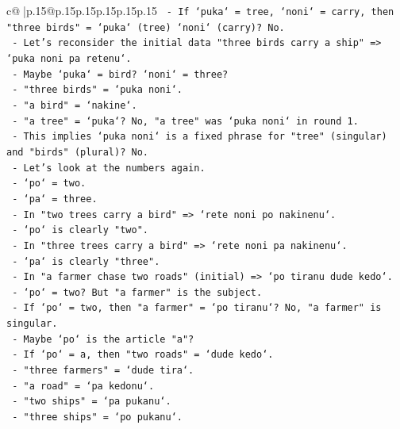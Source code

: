 \documentclass{article}
\begin{document}
{\begin{supertabular}{c@{$\;$}|p{.15\linewidth}@{}p{.15\linewidth}p{.15\linewidth}p{.15\linewidth}p{.15\linewidth}p{.15\linewidth}}
{{{\texttt{                {-} If `puka` = tree, `noni` = carry, then "three birds" = `puka` (tree) `noni` (carry)? No.} \\
\texttt{              {-} Let's reconsider the initial data "three birds carry a ship" => `puka noni pa retenu`.} \\
\texttt{                {-} Maybe `puka` = bird? `noni` = three?} \\
\texttt{                {-} "three birds" = `puka noni`.} \\
\texttt{                {-} "a bird" = `nakine`.} \\
\texttt{                {-} "a tree" = `puka`? No, "a tree" was `puka noni` in round 1.} \\
\texttt{                {-} This implies `puka noni` is a fixed phrase for "tree" (singular) and "birds" (plural)? No.} \\
\texttt{                {-} Let's look at the numbers again.} \\
\texttt{                {-} `po` = two.} \\
\texttt{                {-} `pa` = three.} \\
\texttt{                {-} In "two trees carry a bird" => `rete noni po nakinenu`.} \\
\texttt{                  {-} `po` is clearly "two".} \\
\texttt{                {-} In "three trees carry a bird" => `rete noni pa nakinenu`.} \\
\texttt{                  {-} `pa` is clearly "three".} \\
\texttt{                {-} In "a farmer chase two roads" (initial) => `po tiranu dude kedo`.} \\
\texttt{                  {-} `po` = two? But "a farmer" is the subject.} \\
\texttt{                  {-} If `po` = two, then "a farmer" = `po tiranu`? No, "a farmer" is singular.} \\
\texttt{                  {-} Maybe `po` is the article "a"?} \\
\texttt{                  {-} If `po` = a, then "two roads" = `dude kedo`.} \\
\texttt{                  {-} "three farmers" = `dude tira`.} \\
\texttt{                  {-} "a road" = `pa kedonu`.} \\
\texttt{                  {-} "two ships" = `pa pukanu`.} \\
\texttt{                  {-} "three ships" = `po pukanu`.} \\
}}}
\end{supertabular}}
\end{document}
